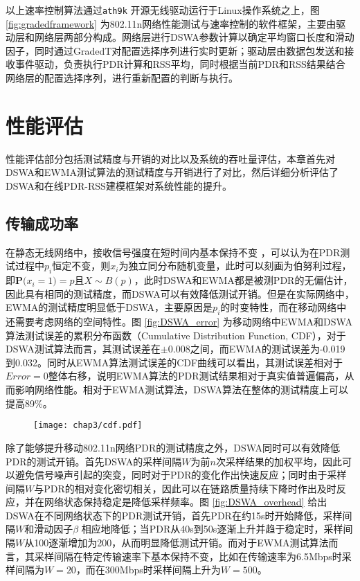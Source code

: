 以上速率控制算法通过\texttt{ath9k} 开源无线驱动运行于Linux操作系统之上，图 \ref{fig:gradedframework} 为802.11n网络性能测试与速率控制的软件框架，主要由驱动层和网络层两部分构成。网络层进行DSWA参数计算以确定平均窗口长度和滑动因子，同时通过GradedT对配置选择序列进行实时更新；驱动层由数据包发送和接收事件驱动，负责执行PDR计算和RSS平均，同时根据当前PDR和RSS结果结合网络层的配置选择序列，进行重新配置的判断与执行。

\section{性能评估}
\label{sec:evaluation80211n}

性能评估部分包括测试精度与开销的对比以及系统的吞吐量评估，本章首先对DSWA和EWMA测试算法的测试精度与开销进行了对比，然后详细分析评估了DSWA和在线PDR-RSS建模框架对系统性能的提升。

\subsection{传输成功率}
\label{sec:pdr}

在静态无线网络中，接收信号强度在短时间内基本保持不变 ，可以认为在PDR测试过程中$p_i$恒定不变，则$x_i$为独立同分布随机变量，此时可以刻画为伯努利过程，即$\textbf{P(}x_i=1\textbf{)}=p$且$X\sim B(p)$，此时DSWA和EWMA都是被测PDR的无偏估计，因此具有相同的测试精度，而DSWA可以有效降低测试开销。但是在实际网络中，EWMA的测试精度明显低于DSWA，主要原因是$p_i$的时变特性，而在移动网络中还需要考虑网络的空间特性。图 \ref{fig:DSWA_error} 为移动网络中EWMA和DSWA算法测试误差的累积分布函数（Cumulative Distribution Function, CDF），对于DSWA测试算法而言，其测试误差在$\pm$0.008之间，而EWMA的测试误差为-0.019到0.032。同时从EWMA算法测试误差的CDF曲线可以看出，其测试误差相对于$Error=0$整体右移，说明EWMA算法的PDR测试结果相对于真实值普遍偏高，从而影响网络性能。相对于EWMA测试算法，DSWA算法在整体的测试精度上可以提高89\%。

\begin{figure}[!htp]
\centering
    \texttt{[image: chap3/cdf.pdf]}
\end{figure}

除了能够提升移动802.11n网络PDR的测试精度之外，DSWA同时可以有效降低PDR的测试开销。首先DSWA的采样间隔$W$为前$n$次采样结果的加权平均，因此可以避免信号噪声引起的突变，同时对于PDR的变化作出快速反应；同时由于采样间隔$W$与PDR的相对变化密切相关，因此可以在链路质量持续下降时作出及时反应，并在网络状态保持稳定是降低采样频率。图 \ref{fig:DSWA_overhead} 给出DSWA在不同网络状态下的PDR测试开销，首先PDR在约15s时开始降低，采样间隔$W$和滑动因子$\beta$ 相应地降低；当PDR从40s到50s逐渐上升并趋于稳定时，采样间隔$W$从100逐渐增加为200，从而明显降低测试开销。而对于EWMA测试算法而言，其采样间隔在特定传输速率下基本保持不变，比如在传输速率为6.5Mbps时采样间隔为$W=20$，而在300Mbps时采样间隔上升为$W=500$。


